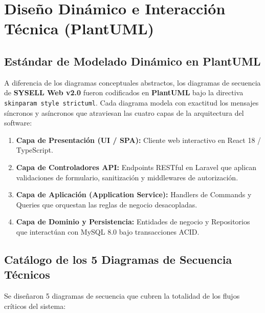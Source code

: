 \chapter{Diseño Dinámico e Interacción Técnica (PlantUML)}

\section{Estándar de Modelado Dinámico en PlantUML}
A diferencia de los diagramas conceptuales abstractos, los diagramas de secuencia de \textbf{SYSELL Web v2.0} fueron codificados en \textbf{PlantUML} bajo la directiva \texttt{skinparam style strictuml}. Cada diagrama modela con exactitud los mensajes síncronos y asíncronos que atraviesan las cuatro capas de la arquitectura del software:
\begin{enumerate}
    \item \textbf{Capa de Presentación (UI / SPA):} Cliente web interactivo en React 18 / TypeScript.
    \item \textbf{Capa de Controladores API:} Endpoints RESTful en Laravel que aplican validaciones de formulario, sanitización y middlewares de autorización.
    \item \textbf{Capa de Aplicación (Application Service):} Handlers de Commands y Queries que orquestan las reglas de negocio desacopladas.
    \item \textbf{Capa de Dominio y Persistencia:} Entidades de negocio y Repositorios que interactúan con MySQL 8.0 bajo transacciones ACID.
\end{enumerate}

\section{Catálogo de los 5 Diagramas de Secuencia Técnicos}
Se diseñaron 5 diagramas de secuencia que cubren la totalidad de los flujos críticos del sistema:

